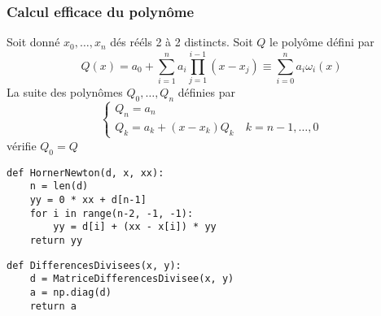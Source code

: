 \subsubsection{Calcul efficace du polynôme}
\begin{prop}
   Soit donné $x_0, \ldots, x_n$ dés rééls 2 à 2 distincts. Soit $Q$ le polyôme défini par 
   \[
   Q(x) = a_0 + \sum_{i=1}^{n} a_i \prod_{j=1}^{i-1} (x - x_j) \equiv \sum_{i=0}^{n} a_i\omega_i(x) 
   \] 
   La suite des polynômes $Q_0, \ldots, Q_n$ définies par
   \[
   \begin{cases}
       Q_n = a_n\\
       Q_k = a_k + (x - x_k)Q_k \quad k = n-1, \ldots, 0
   \end{cases}
   \] 
   vérifie $Q_0 = Q$
\end{prop}
\begin{lstlisting}
def HornerNewton(d, x, xx):
    n = len(d)
    yy = 0 * xx + d[n-1]
    for i in range(n-2, -1, -1):
        yy = d[i] + (xx - x[i]) * yy
    return yy
\end{lstlisting}
\begin{lstlisting}
def DifferencesDivisees(x, y):
    d = MatriceDifferencesDivisee(x, y)
    a = np.diag(d)
    return a
\end{lstlisting}
